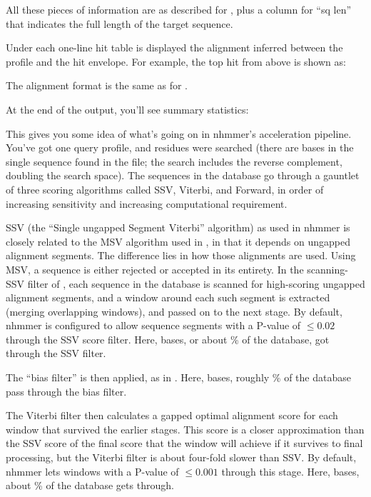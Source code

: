 
All these pieces of information are as described for ,
plus a column for ``sq len'' that indicates the full length of the
target sequence.

Under each one-line hit table is displayed the alignment inferred
between the profile and the hit envelope. For example, the top hit
from above is shown as:


The alignment format is the same as for .

At the end of the output, you'll see summary statistics:


This gives you some idea of what's going on in nhmmer's acceleration
pipeline. You've got one query profile, and \NMHnres{} residues were
searched (there are \NMHntop{} bases in the single sequence found in
the file; the search includes the reverse complement, doubling the
search space). The sequences in the database go through a gauntlet of
three scoring algorithms called SSV, Viterbi, and Forward, in order of
increasing sensitivity and increasing computational requirement.

SSV (the ``Single ungapped Segment Viterbi'' algorithm) as used in
nhmmer is closely related to the MSV algorithm used in
, in that it depends on ungapped alignment
segments. The difference lies in how those alignments are used. Using
MSV, a sequence is either rejected or accepted in its entirety. In the
scanning-SSV filter of , each sequence in the database is
scanned for high-scoring ungapped alignment segments, and a window
around each such segment is extracted (merging overlapping windows),
and passed on to the next stage. By default, nhmmer is configured to
allow sequence segments with a P-value of $\leq 0.02$ through the SSV
score filter. Here, \NMHnssv{} bases,
or about \NMHfracssv{}\% of the database, got through the SSV filter.

The ``bias filter'' is then applied, as in . Here, 
\NMHnbias{} bases, roughly \NMHfracbias{}\% of the database
pass through the bias filter.

The Viterbi filter then calculates a gapped optimal alignment score
for each window that survived the earlier stages. This score is a
closer approximation than the SSV score of the final score that the
window will achieve if it survives to final processing, but the
Viterbi filter is about four-fold slower than SSV. By default, nhmmer
lets windows with a P-value of $\leq 0.001$ through this stage. Here,
\NMHnvit{} bases, about \NMHfracvit{}\% of the database gets through.

